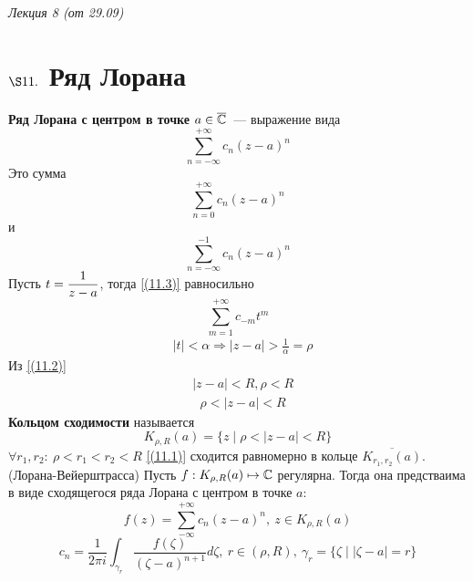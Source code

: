 \begin{flushright}
    \textit{Лекция 8 (от 29.09)}
\end{flushright}
\section{$\S 11.$ Ряд Лорана}
\Def \textbf{Ряд Лорана с центром в точке $a \in \overline{\mathbb{C}}$}~--- выражение вида
\begin{equation}\label{(11.1)}
    \sum_{n=-\infty}^{+\infty}c_n(z-a)^n
\end{equation}
Это сумма
\begin{equation}\label{(11.2)}
    \sum_{n=0}^{+\infty}c_n(z-a)^n
\end{equation}
и
\begin{equation}\label{(11.3)}
    \sum_{n=-\infty}^{-1}c_n(z-a)^n
\end{equation}
Пусть $t = \displaystyle \frac{1}{z-a}$, тогда \eqref{(11.3)} равносильно
\begin{equation}\label{(11.4)}
    \sum_{m=1}^{+\infty}c_{-m}t^m
\end{equation}
\begin{align*}
  & \left| t \right| < \alpha \Rightarrow \left| z - a \right| > \frac{1}{\alpha} = \rho
\end{align*}
Из \eqref{(11.2)}
\begin{align*}
  & \left| z-a \right|<R, \rho < R
\end{align*}
\begin{align*}
  & \rho < \left| z-a \right| < R
\end{align*}
\textbf{Кольцом сходимости} называется
\begin{equation}\label{(11.5)}
    K_{\rho, R}(a) = \{z \mid \rho < \left| z-a \right| < R\}
\end{equation}
$\forall r_1, r_2: \ \rho < r_1 < r_2 < R$ \eqref{(11.1)} сходится
равномерно в кольце $\overline{K_{r_1,r_2}(a)}$.
\theorem (Лорана-Вейерштрасса)
Пусть $f: K_{\rho,R}(a) \mapsto \mathbb{C}$ регулярна. Тогда она предстваима в виде
сходящегося ряда Лорана с центром в точке $a$:
\begin{equation}\label{(11.6)}
    f(z) = \sum_{-\infty}^{+\infty}c_n(z-a)^n, \ z \in K_{\rho,R}(a)
\end{equation}
\begin{equation}\label{(11.7)}
    c_n = \frac{1}{2\pi i}\int_{\gamma_r}\frac{f(\zeta)}{(\zeta - a)^{n+1}}d\zeta, \ r \in (\rho, R), \ \gamma_r = \{\zeta \mid \left| \zeta - a \right| = r\}
\end{equation}
